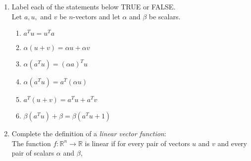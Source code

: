 \documentclass[11pt,fleqn]{article}
\begin{document}
\renewcommand{\headrulewidth}{0pt}
\newcommand{\blank}[1]{\rule{#1}{0.75pt}}
\renewcommand{\d}{\displaystyle}
\vspace*{-0.7in}
\begin{center}
  \large {}
\end{center}
\begin{enumerate}
\item  Label each of the statements below TRUE or FALSE.\\

Let $a, u,$ and $v$ be $n$-vectors and let $\alpha$ and $\beta$ be scalars.

\begin{multicols}{3}
\begin{enumerate}
\item $a^Tu=u^Ta$\\

\vspace{.3in}

\item $\alpha(u+v)=\alpha u+ \alpha v$\\

\columnbreak

\item $\alpha(a^Tu)=(\alpha a)^Tu$\\

\vspace{.3in}

\item $\alpha(a^Tu)=a^T(\alpha u)$\\

\columnbreak

\item $a^T(u+v)=a^Tu+a^Tv$\\

\vspace{.3in}

\item $\beta(a^Tu)+\beta=\beta(a^Tu+1)$\\
\end{enumerate}
\end{multicols}
\vspace{.3in}
\item Complete the definition of a \emph{linear vector function}:\\
The function $f: \mathbb{R}^n \to \mathbb{R}$ is linear if for every pair of vectors $u$ and $v$ and every pair of scalars $\alpha$ and $\beta,$


\end{enumerate}
\end{document}
